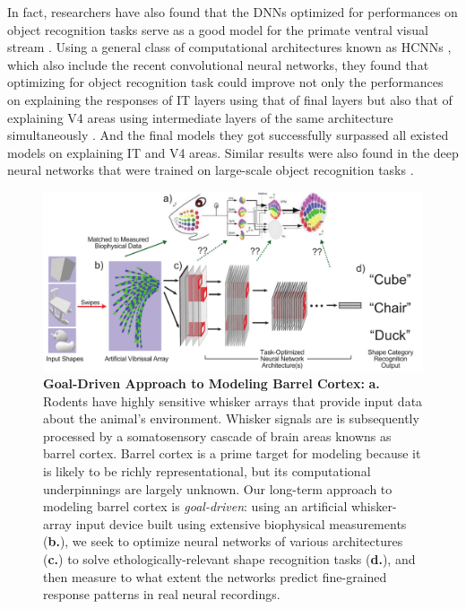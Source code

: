 In fact, researchers have also found that the DNNs optimized for performances on object recognition tasks serve as a good model for the primate ventral visual stream \cite{Yamins2013, Yamins2014, cadieu2014deep}.
Using a general class of computational architectures known as HCNNs \cite{lecun1995convolutional}, which also include the recent convolutional neural networks, they found that optimizing for object recognition task could improve not only the performances on explaining the responses of IT layers using that of final layers but also that of explaining V4 areas using intermediate layers of the same architecture simultaneously \cite{cadieu2014deep}.
And the final models they got successfully surpassed all existed models on explaining IT and V4 areas. Similar results were also found in the deep neural networks that were trained on large-scale object recognition tasks \cite{Yamins2014}.

\begin{figure}
\centering
\includegraphics [width=1\linewidth]{figures/schematic.pdf}
\vspace{-2mm}
\caption{\textbf{Goal-Driven Approach to Modeling Barrel Cortex:} \textbf{a.} Rodents have highly sensitive whisker arrays that provide input data about the animal's environment.  Whisker signals are is subsequently processed by a somatosensory cascade of brain areas knowns as barrel cortex. Barrel cortex is a prime target for modeling because it is likely to be richly representational, but its computational underpinnings are largely unknown. Our long-term approach to modeling barrel cortex is \emph{goal-driven}: using an artificial whisker-array input device built using extensive biophysical measurements (\textbf{b.}), we seek to optimize neural networks of various architectures (\textbf{c.}) to solve ethologically-relevant shape recognition tasks (\textbf{d.}), and then measure to what extent the networks predict fine-grained response patterns in real neural recordings. ~\label{fig_schematic}}
\end{figure}



